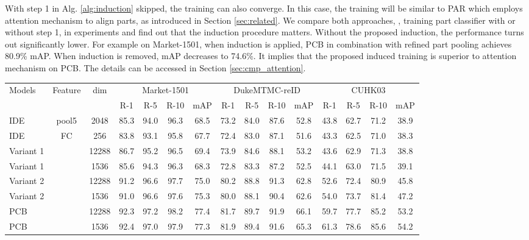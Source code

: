 \documentclass[10pt,twocolumn,letterpaper]{article}
\begin{document}
{{{With step 1 in Alg. \ref{alg:induction} skipped, the training can also converge. In this case, the training will be similar to PAR \cite{Zhao2017Deeply} which employs attention mechanism to align parts, as introduced in Section \ref{sec:related}. We compare both approaches, \ie, training part classifier with or without step 1, in experiments and find out that the induction procedure matters. Without the proposed induction, the performance turns out significantly lower. For example on Market-1501, when induction is applied, PCB in combination with refined part pooling achieves 80.9\% mAP. When induction is removed, mAP decreases to 74.6\%. It implies that the proposed induced training is superior to attention mechanism on PCB. The details can be accessed in Section \ref{sec:cmp_attention}. 

\setlength{\tabcolsep}{5.6pt}
\begin{table*}[]
\setlength{\abovecaptionskip}{-0.1cm}
\setlength{\belowcaptionskip}{-0.2cm}
\begin{center}
\begin{tabular}{l|c|c|c c c c|c c c c|c c c c}
\hline
\multicolumn{1}{l|}{\multirow{2}{*}{Models }}&\multicolumn{1}{c|}{\multirow{2}{*}{Feature}}&\multicolumn{1}{c|}{\multirow{2}{*}{dim}}&\multicolumn{4}{c|}{Market-1501} & \multicolumn{4}{c|}{DukeMTMC-reID} & \multicolumn{4}{c}{CUHK03}\\ 
\cline{4-15}
\multicolumn{1}{c|}{}&\multicolumn{1}{c|}{}&&\multicolumn{1}{c}{R-1}&{R-5}&{R-10}&{mAP}&{R-1}&{R-5}&{R-10}&{mAP}&{R-1}&{R-5}&{R-10}&{mAP}\\
\hline
IDE& pool5 & 2048 &85.3&94.0&96.3&68.5  &73.2&84.0&87.6& 52.8  &43.8&62.7&71.2&38.9\\
IDE& FC & 256 &83.8&93.1&95.8&67.7  &72.4& 83.0&87.1& 51.6   &43.3&62.5&71.0&38.3\\ 

Variant 1&  &12288 &86.7&95.2&96.5&69.4 &73.9&84.6&88.1& 53.2 &43.6&62.9&71.3&38.8\\
Variant 1&  &1536 &85.6&94.3&96.3&68.3 &72.8&83.3&87.2& 52.5 &44.1&63.0&71.5&39.1\\

Variant 2 & &12288 &91.2&96.6&97.7&75.0 &80.2&88.8&91.3&62.8    &52.6&72.4&80.9 &45.8\\
Variant 2 & &1536 &91.0&96.6&97.6&75.3 &80.0&88.1&90.4&62.6     &54.0&73.7&81.4&47.2\\

\hline
PCB & &12288    &92.3&97.2&98.2&77.4    &81.7&89.7&91.9&66.1    &59.7&77.7&85.2&53.2\\
PCB & &1536    &92.4&97.0&97.9&77.3   &81.9&89.4&91.6&65.3     &61.3&78.6&85.6&54.2\\


\end{tabular}
\end{center}
\end{table*}}}}
\end{document}
